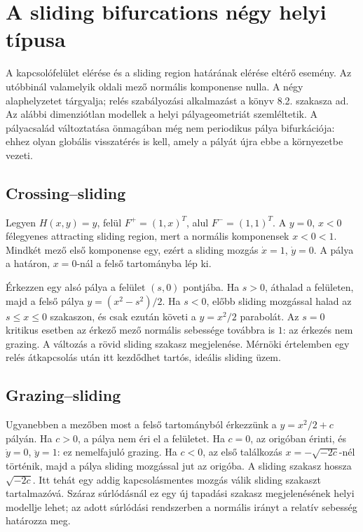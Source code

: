 \section{A sliding bifurcations négy helyi típusa}\label{sec:four_sliding}
A kapcsolófelület elérése és a sliding region határának elérése eltérő esemény. Az utóbbinál valamelyik oldali mező normális komponense nulla. A négy alaphelyzetet \cite[8.1. szakasz]{dib} tárgyalja; relés szabályozási alkalmazást a könyv 8.2. szakasza ad. Az alábbi dimenziótlan modellek a helyi pályageometriát szemléltetik. A pályacsalád változtatása önmagában még nem periodikus pálya bifurkációja: ehhez olyan globális visszatérés is kell, amely a pályát újra ebbe a környezetbe vezeti.

\subsection{Crossing--sliding}
\examplebody

Legyen $H(x,y)=y$, felül $F^+=(1,x)^T$, alul $F^-=(1,1)^T$. A $y=0$, $x<0$ félegyenes attracting sliding region, mert a normális komponensek $x<0<1$. Mindkét mező első komponense egy, ezért a sliding mozgás $\dot x=1$, $\dot y=0$. A pálya a határon, $x=0$-nál a felső tartományba lép ki.

Érkezzen egy alsó pálya a felület $(s,0)$ pontjába. Ha $s>0$, áthalad a felületen, majd a felső pálya $y=(x^2-s^2)/2$. Ha $s<0$, előbb sliding mozgással halad az $s\leq x\leq0$ szakaszon, és csak ezután követi a $y=x^2/2$ parabolát. Az $s=0$ kritikus esetben az érkező mező normális sebessége továbbra is $1$: az érkezés nem grazing. A változás a rövid sliding szakasz megjelenése. Mérnöki értelemben egy relés átkapcsolás után itt kezdődhet tartós, ideális sliding üzem.
\exampleend

\subsection{Grazing--sliding}
\examplebody

Ugyanebben a mezőben most a felső tartományból érkezzünk a $y=x^2/2+c$ pályán. Ha $c>0$, a pálya nem éri el a felületet. Ha $c=0$, az origóban érinti, és $\dot y=0$, $\ddot y=1$: ez nemelfajuló grazing. Ha $c<0$, az első találkozás $x=-\sqrt{-2c}$-nél történik, majd a pálya sliding mozgással jut az origóba. A sliding szakasz hossza $\sqrt{-2c}$. Itt tehát egy addig kapcsolásmentes mozgás válik sliding szakaszt tartalmazóvá. Száraz súrlódásnál ez egy új tapadási szakasz megjelenésének helyi modellje lehet; az adott súrlódási rendszerben a normális irányt a relatív sebesség határozza meg.
\exampleend


